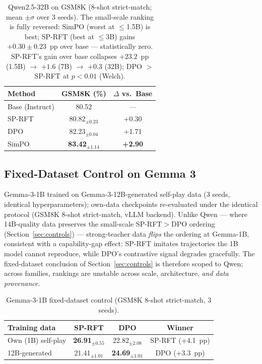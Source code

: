 \documentclass{article}
\newcommand{\sprft}{SP-RFT}
\begin{document}
\begin{table}[ht]
\centering
\caption{Qwen2.5-32B on GSM8K (8-shot strict-match; mean $\pm\sigma$ over 3 seeds). The small-scale ranking is fully reversed: SimPO (worst at $\leq$1.5B) is best; \sprft{} (best at $\leq$3B) gains $+0.30\pm0.23$~pp over base --- statistically zero. \sprft{}'s gain over base collapses $+23.2$~pp (1.5B) $\to$ $+1.6$ (7B) $\to$ $+0.3$ (32B); DPO $>$ \sprft{} at $p<0.01$ (Welch).}
\label{tab:qwen32b}
\small
\begin{tabular}{@{}lcc@{}}
\toprule
\textbf{Method} & \textbf{GSM8K (\%)} & \textbf{$\Delta$ vs.\ Base} \\
\midrule
Base (Instruct) & 80.52 & --- \\
\sprft{} & 80.82$_{\pm 0.23}$ & +0.30 \\
DPO & 82.23$_{\pm 0.04}$ & +1.71 \\
SimPO & \textbf{83.42}$_{\pm 1.14}$ & \textbf{+2.90} \\
\bottomrule
\end{tabular}
\end{table}

\subsection{Fixed-Dataset Control on Gemma 3}
\label{app:gemma_fixed_data}

Gemma-3-1B trained on Gemma-3-12B-generated self-play data (3 seeds, identical hyperparameters); own-data checkpoints re-evaluated under the identical protocol (GSM8K 8-shot strict-match, vLLM backend). Unlike Qwen --- where 14B-quality data preserves the small-scale \sprft{}$>$DPO ordering (Section~\ref{sec:controls}) --- strong-teacher data \emph{flips} the ordering at Gemma-1B, consistent with a capability-gap effect: \sprft{} imitates trajectories the 1B model cannot reproduce, while DPO's contrastive signal degrades gracefully. The fixed-dataset conclusion of Section~\ref{sec:controls} is therefore scoped to Qwen; across families, rankings are unstable across scale, architecture, \emph{and data provenance}.

\begin{table}[ht]
\centering
\caption{Gemma-3-1B fixed-dataset control (GSM8K 8-shot strict-match, 3 seeds).}
\label{tab:gemma_fixed}
\small
\begin{tabular}{@{}lccc@{}}
\toprule
\textbf{Training data} & \textbf{\sprft{}} & \textbf{DPO} & \textbf{Winner} \\
\midrule
Own (1B) self-play & \textbf{26.91}$_{\pm 0.55}$ & 22.82$_{\pm 2.08}$ & \sprft{} (+4.1~pp) \\
12B-generated & 21.41$_{\pm 1.01}$ & \textbf{24.69}$_{\pm 1.01}$ & DPO (+3.3~pp) \\
\bottomrule
\end{tabular}
\end{table}
\end{document}
